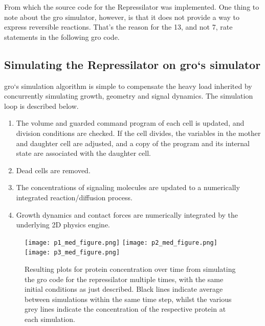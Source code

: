 \documentclass[12pt]{article}
\begin{document}
    From which the source code for the Repressilator was implemented. One thing to note about the gro simulator, however, is that it does not provide a way to express reversible reactions. That's the reason for the 13, and not 7, rate statements in the following gro code.
    
    

\subsection{Simulating the Repressilator on gro`s simulator}

    gro`s simulation algorithm is simple to compensate the heavy load inherited by concurrently simulating growth, geometry and signal dynamics. The simulation loop is described below. 
    
    \begin{enumerate}
        \item The volume and guarded command program of each cell is updated, and division conditions are checked. If the cell divides, the variables in the mother and daughter cell are adjusted, and a copy of the program and its internal state are associated with the daughter cell.
        \item Dead cells are removed.
        \item The concentrations of signaling molecules are updated to a numerically integrated reaction/diffusion process.
        \item Growth dynamics and contact forces are numerically integrated by the underlying 2D physics engine.
    \end{enumerate}
    
    \begin{figure}[ht]
    \centering
      \texttt{[image: p1\_med\_figure.png]}
    \endminipage\hfill
      \texttt{[image: p2\_med\_figure.png]}
    \endminipage\hfill
      \texttt{[image: p3\_med\_figure.png]}
    \endminipage
    \caption{Resulting plots for protein concentration over time from simulating the gro code for the repressilator multiple times, with the same initial conditions as just described. Black lines indicate average between simulations within the same time step, whilst the various grey lines indicate the concentration of the respective protein at each simulation.}
    \label{fig:tons_of_simulations}
    \end{figure}
\end{document}
